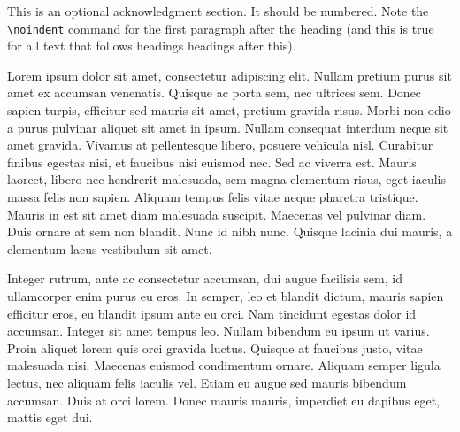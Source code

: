 \noindent This is an optional acknowledgment section. It should be numbered. Note the \texttt{\textbackslash noindent} command for the first paragraph after the heading (and this is true for all text that follows headings headings after this).

Lorem ipsum dolor sit amet, consectetur adipiscing elit. Nullam pretium purus sit amet ex accumsan venenatis. Quisque ac porta sem, nec ultrices sem. Donec sapien turpis, efficitur sed mauris sit amet, pretium gravida risus. Morbi non odio a purus pulvinar aliquet sit amet in ipsum. Nullam consequat interdum neque sit amet gravida. Vivamus at pellentesque libero, posuere vehicula nisl. Curabitur finibus egestas nisi, et faucibus nisi euismod nec. Sed ac viverra est. Mauris laoreet, libero nec hendrerit malesuada, sem magna elementum risus, eget iaculis massa felis non sapien. Aliquam tempus felis vitae neque pharetra tristique. Mauris in est sit amet diam malesuada suscipit. Maecenas vel pulvinar diam. Duis ornare at sem non blandit. Nunc id nibh nunc. Quisque lacinia dui mauris, a elementum lacus vestibulum sit amet.

Integer rutrum, ante ac consectetur accumsan, dui augue facilisis sem, id ullamcorper enim purus eu eros. In semper, leo et blandit dictum, mauris sapien efficitur eros, eu blandit ipsum ante eu orci. Nam tincidunt egestas dolor id accumsan. Integer sit amet tempus leo. Nullam bibendum eu ipsum ut varius. Proin aliquet lorem quis orci gravida luctus. Quisque at faucibus justo, vitae malesuada nisi. Maecenas euismod condimentum ornare. Aliquam semper ligula lectus, nec aliquam felis iaculis vel. Etiam eu augue sed mauris bibendum accumsan. Duis at orci lorem. Donec mauris mauris, imperdiet eu dapibus eget, mattis eget dui.
